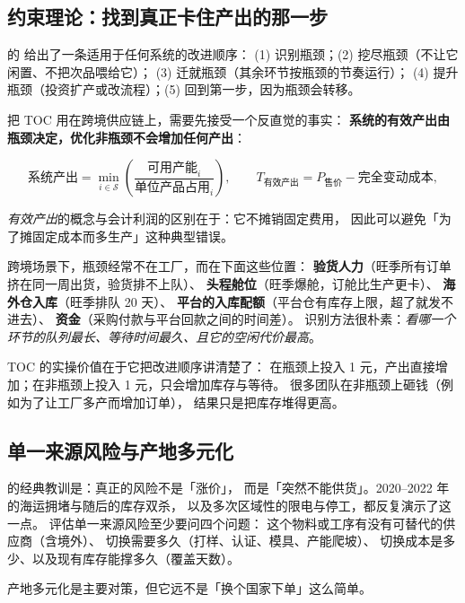 \subsection{约束理论：找到真正卡住产出的那一步}

\cite{goldratt2004goal} 的
给出了一条适用于任何系统的改进顺序：
(1) 识别瓶颈；(2) 挖尽瓶颈（不让它闲置、不把次品喂给它）；
(3) 迁就瓶颈（其余环节按瓶颈的节奏运行）；
(4) 提升瓶颈（投资扩产或改流程）；(5) 回到第一步，因为瓶颈会转移。

把 TOC 用在跨境供应链上，需要先接受一个反直觉的事实：
\textbf{系统的有效产出由瓶颈决定，优化非瓶颈不会增加任何产出}：

\begin{equation}
\text{系统产出} = \min_{i\in\mathcal{S}}
\left(\frac{\text{可用产能}_i}{\text{单位产品占用}_i}\right),
\qquad
T_{\text{有效产出}} = P_{\text{售价}} - \text{完全变动成本},
\label{eq:toc}
\end{equation}

\emph{有效产出}的概念与会计利润的区别在于：它不摊销固定费用，
因此可以避免「为了摊固定成本而多生产」这种典型错误。

跨境场景下，瓶颈经常不在工厂，而在下面这些位置：
\textbf{验货人力}（旺季所有订单挤在同一周出货，验货排不上队）、
\textbf{头程舱位}（旺季爆舱，订舱比生产更卡）、
\textbf{海外仓入库}（旺季排队 20 天）、
\textbf{平台的入库配额}（平台仓有库存上限，超了就发不进去）、
\textbf{资金}（采购付款与平台回款之间的时间差）。
识别方法很朴素：\emph{看哪一个环节的队列最长、等待时间最久、且它的空闲代价最高}。

TOC 的实操价值在于它把改进顺序讲清楚了：
在瓶颈上投入 1 元，产出直接增加；在非瓶颈上投入 1 元，只会增加库存与等待。
很多团队在非瓶颈上砸钱（例如为了让工厂多产而增加订单），
结果只是把库存堆得更高。

\subsection{单一来源风险与产地多元化}

的经典教训是：真正的风险不是「涨价」，
而是「突然不能供货」。2020--2022 年的海运拥堵与随后的库存双杀，
以及多次区域性的限电与停工，都反复演示了这一点。
评估单一来源风险至少要问四个问题：
这个物料或工序有没有可替代的供应商（含境外）、
切换需要多久（打样、认证、模具、产能爬坡）、
切换成本是多少、以及现有库存能撑多久（覆盖天数）。

产地多元化是主要对策，但它远不是「换个国家下单」这么简单。


